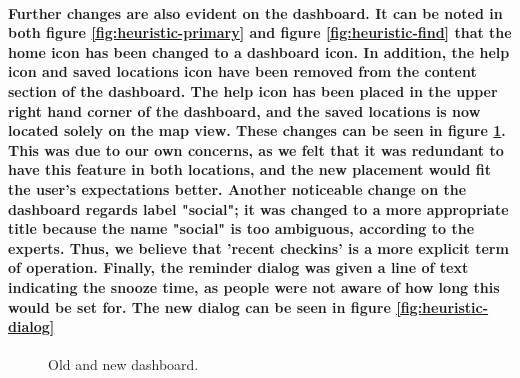 \documentclass{report}
\begin{document}
    \paragraph{Further changes are also evident on the dashboard. It can be
    noted in both figure \ref{fig:heuristic-primary}
     and figure \ref{fig:heuristic-find} that the home icon has been changed
    to a dashboard icon. In addition, the help icon and saved locations icon have
    been removed from the content section of the dashboard. The help icon has been
    placed in the upper right hand corner of the dashboard, and the saved locations
    is now located solely on the map view. These changes can be seen in figure
    \ref{fig:heuristic-dashboard}. This was due to our own concerns, as we felt that it was redundant to
    have this feature in both locations, and the new placement would fit the user's
    expectations better. Another noticeable change on the dashboard regards label
    "social"; it was changed to a more appropriate title because the name "social"
    is too ambiguous, according to the experts. Thus, we believe that 'recent
    checkins' is a more explicit term of operation. Finally, the reminder dialog was
    given a line of text indicating the snooze time, as people were not aware of how
    long this would be set for. The new dialog can be seen in figure
    \ref{fig:heuristic-dialog}}
    \begin{figure}
    \centering
    \caption{Old and new dashboard.}
    \label{fig:heuristic-dashboard}
    \end{figure}
\end{document}
